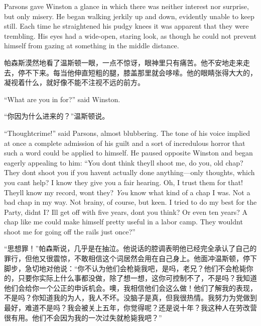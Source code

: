 \begin{paracol}{2}
\switchcolumn*

Parsons gave Winston a glance in which there was neither interest nor
surprise, but only misery. He began walking jerkily up and down,
evidently unable to keep still. Each time he straightened his pudgy
knees it was apparent that they were trembling. His eyes had a
wide-open, staring look, as though he could not prevent himself from
gazing at something in the middle distance.

\switchcolumn

帕森斯漠然地看了温斯顿一眼，一点不惊讶，眼神里只有痛苦。他不安地走来走去，停不下来。每当他伸直短粗的腿，膝盖那里就会哆嗦。他的眼睛张得大大的，凝视着什么，就好像不能不注视不远的前方。

\switchcolumn*

``What are you in for?'' said Winston.

\switchcolumn

``你因为什么进来的？''温斯顿说。

\switchcolumn*

``Thoughtcrime!'' said Parsons, almost blubbering. The tone of his voice
implied at once a complete admission of his guilt and a sort of
incredulous horror that such a word could be applied to himself. He
paused opposite Winston and began eagerly appealing to him: ``You
don\textquotesingle t think they\textquotesingle ll shoot me, do you,
old chap? They don\textquotesingle t shoot you if you
haven\textquotesingle t actually done anything---only thoughts, which
you can\textquotesingle t help? I know they give you a fair hearing. Oh,
I trust them for that! They\textquotesingle ll know my record,
won\textquotesingle t they? \emph{You} know what kind of a chap I was.
Not a bad chap in my way. Not brainy, of course, but keen. I tried to do
my best for the Party, didn\textquotesingle t I? I\textquotesingle ll
get off with five years, don\textquotesingle t you think? Or even ten
years? A chap like me could make himself pretty useful in a labor camp.
They wouldn\textquotesingle t shoot me for going off the rails just
once?''

\switchcolumn

``思想罪！''帕森斯说，几乎是在抽泣。他说话的腔调表明他已经完全承认了自己的罪行，但他又很震惊，不敢相信这个词居然会用在自己身上。他面冲温斯顿，停下脚步，急切地对他说：``你不认为他们会枪毙我吧，是吗，老兄？他们不会枪毙你的，只要你实际上什么事都没做，除了想一想，这你可控制不了，不是吗？我知道他们会给你一个公正的申诉机会。噢，我相信他们会这么做！他们了解我的表现，不是吗？你知道我的为人，我人不坏。没脑子是真，但我很热情。我努力为党做到最好，难道不是吗？我会被关上五年，你觉得呢？还是说十年？我这种人在劳改营很有用。他们不会因为我的一次过失就枪毙我吧？''


\end{paracol}
